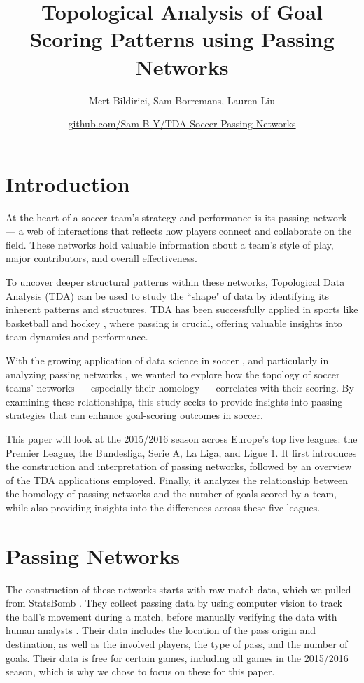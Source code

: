 \documentclass[10pt,twocolumn]{article}
\title{\textbf{Topological Analysis of Goal Scoring Patterns using Passing Networks}}
\author{Mert Bildirici, Sam Borremans, Lauren Liu}
\date{\href{https://github.com/Sam-B-Y/TDA-Soccer-Passing-Networks}{github.com/Sam-B-Y/TDA-Soccer-Passing-Networks}}
\begin{document}
\maketitle

\section*{Introduction}
At the heart of a soccer team's strategy and performance is its passing network — a web of interactions that reflects how players connect and collaborate on the field. These networks hold valuable information about a team's style of play, major contributors, and overall effectiveness. 

To uncover deeper structural patterns within these networks, Topological Data Analysis (TDA) can be used to study the ``shape" of data by identifying its inherent patterns and structures. TDA has been successfully applied in sports like basketball \cite{roehm-2021} and hockey \cite{goldfarb-2014}, where passing is crucial, offering valuable insights into team dynamics and performance. 

With the growing application of data science in soccer \cite{lolli-2024}, and particularly in analyzing passing networks \cite{buldu-2018}, we wanted to explore how the topology of soccer teams' networks — especially their homology — correlates with their scoring. By examining these relationships, this study seeks to provide insights into passing strategies that can enhance goal-scoring outcomes in soccer.

This paper will look at the 2015/2016 season across Europe's top five leagues: the Premier League, the Bundesliga, Serie A, La Liga, and Ligue 1. It first introduces the construction and interpretation of passing networks, followed by an overview of the TDA applications employed. Finally, it analyzes the relationship between the homology of passing networks and the number of goals scored by a team, while also providing insights into the differences across these five leagues.

\section*{Passing Networks}

The construction of these networks starts with raw match data, which we pulled from StatsBomb \cite{statsbomb-no-date}. They collect passing data by using computer vision to track the ball's movement during a match, before manually verifying the data with human analysts \cite{hudl-statsbomb-data-champions-2024}. Their data includes the location of the pass origin and destination, as well as the involved players, the type of pass, and the number of goals. Their data is free for certain games, including all games in the 2015/2016 season, which is why we chose to focus on these for this paper.
\end{document}
